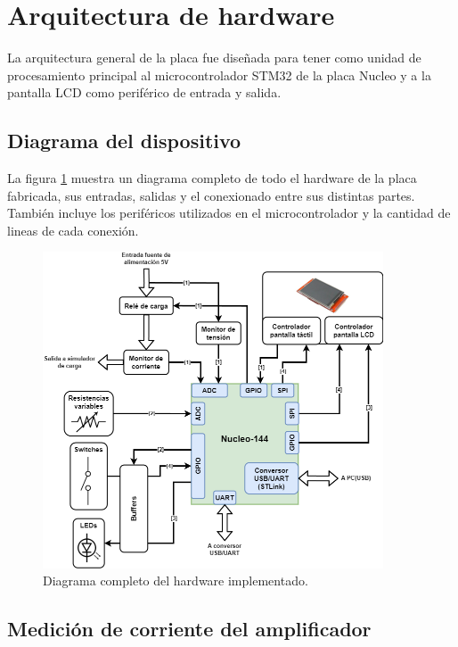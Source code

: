 \section{Arquitectura de hardware}

La arquitectura general de la placa fue diseñada para tener como unidad de procesamiento principal al microcontrolador STM32 de la placa Nucleo y a la pantalla LCD como periférico de entrada y salida.

\subsection{Diagrama del dispositivo}
\label{sec:diagDisp}

La figura \ref{fig:estrucInt} muestra un diagrama completo de todo el hardware de la placa fabricada, sus entradas, salidas y el conexionado entre sus distintas partes. También incluye los periféricos utilizados en el microcontrolador y la cantidad de lineas de cada conexión.

\begin{figure}[H]
\centering
\includegraphics[width=0.9\textwidth]{./Figures/diagDisp.png}
\caption{Diagrama completo del hardware implementado.}
\label{fig:estrucInt}
\end{figure}

\subsection{Medición de corriente del amplificador}

